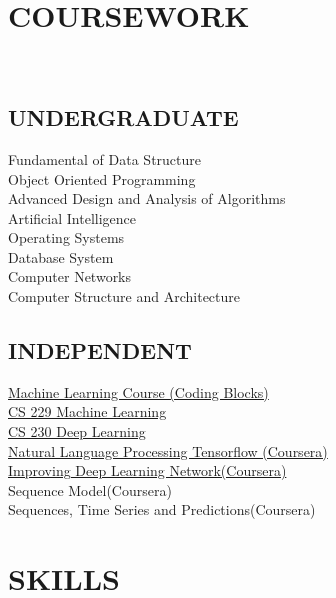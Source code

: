 \documentclass[a4paper]{deedy-resume-openfont}
\begin{document}
\begin{minipage}[t]{0.33\textwidth}

\section{COURSEWORK}
\quad \\
\subsection{UNDERGRADUATE}

Fundamental of Data Structure \\
Object Oriented Programming \\ 
Advanced Design and Analysis of Algorithms \\ 
Artificial Intelligence \\ 
Operating Systems \\ 
Database System \\ 
Computer Networks \\ 
Computer Structure and Architecture \\ 

\sectionsep

\subsection{INDEPENDENT}

\href{https://online.codingblocks.com/app/certificates/CBOL-26635-2848}{Machine Learning Course (Coding Blocks)} \\
\href{http://cs229.stanford.edu/}{CS 229 Machine Learning} \\
\href{https://cs230.stanford.edu/}{CS 230 Deep Learning} \\
\href{https://coursera.org/share/0d85004d7396f79556aa1a92de8a3ab5}{Natural Language Processing Tensorflow (Coursera)} \\
\href{https://coursera.org/share/bf38126b8c3094913923da5075b257d5}{Improving Deep Learning Network(Coursera)} \\
Sequence Model(Coursera) \\
Sequences, Time Series and Predictions(Coursera) \\



\section{SKILLS}

\end{minipage}
\end{document}
